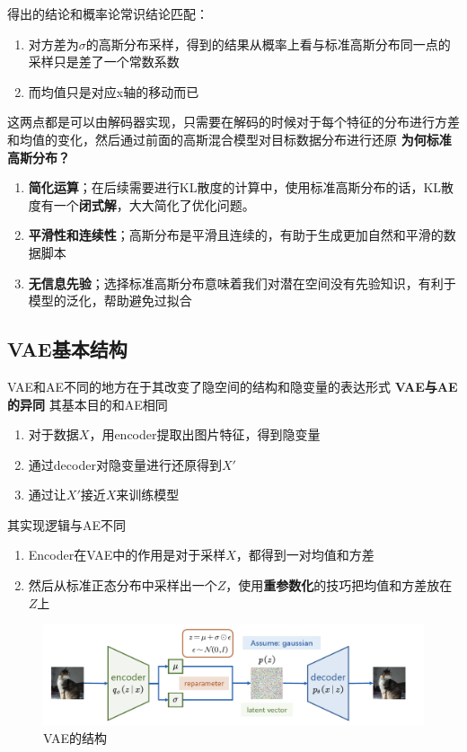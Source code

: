 得出的结论和概率论常识结论匹配：
\begin{enumerate}
    \item 对方差为$\sigma$的高斯分布采样，得到的结果从概率上看与标准高斯分布同一点的采样只是差了一个常数系数
    \item 而均值只是对应x轴的移动而已
\end{enumerate}

这两点都是可以由解码器实现，只需要在解码的时候对于每个特征的分布进行方差和均值的变化，然后通过前面的高斯混合模型对目标数据分布进行还原
\textbf{为何标准高斯分布？}\newline
\begin{enumerate}
    \item \textbf{简化运算}；在后续需要进行KL散度的计算中，使用标准高斯分布的话，KL散度有一个\textbf{闭式解}，大大简化了优化问题。
    \item \textbf{平滑性和连续性}；高斯分布是平滑且连续的，有助于生成更加自然和平滑的数据脚本
    \item \textbf{无信息先验}；选择标准高斯分布意味着我们对潜在空间没有先验知识，有利于模型的泛化，帮助避免过拟合
\end{enumerate}

\subsection{VAE基本结构}
VAE和AE不同的地方在于其改变了隐空间的结构和隐变量的表达形式
\textbf{VAE与AE的异同}\newline
其基本目的和AE相同
\begin{enumerate}
    \item 对于数据$X$，用encoder提取出图片特征，得到隐变量
    \item 通过decoder对隐变量进行还原得到$X'$
    \item 通过让$X'$接近$X$来训练模型
\end{enumerate}
其实现逻辑与AE不同
\begin{enumerate}
    \item Encoder在VAE中的作用是对于采样$X$，都得到一对均值和方差
    \item 然后从标准正态分布中采样出一个$Z$，使用\textbf{重参数化}的技巧把均值和方差放在$Z$上
\end{enumerate}
\begin{figure}[htbp]
    \centering
    \includegraphics[width=\textwidth]{figures/chapter2/vaeee.png}
    \caption{VAE的结构}
    \label{fig:vae_structure}
\end{figure}


